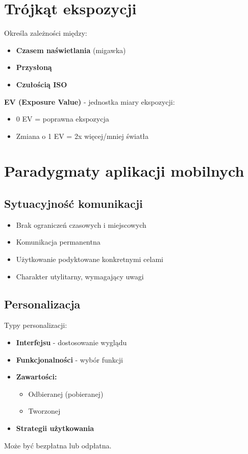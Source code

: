 \section{Trójkąt ekspozycji}
Określa zależności między:
\begin{itemize}[noitemsep]
    \item \textbf{Czasem naświetlania} (migawka)
    \item \textbf{Przysłoną}
    \item \textbf{Czułością ISO}
\end{itemize}

\textbf{EV (Exposure Value)} - jednostka miary ekspozycji:
\begin{itemize}[noitemsep]
    \item 0 EV = poprawna ekspozycja
    \item Zmiana o 1 EV = 2x więcej/mniej światła
\end{itemize}

\section{Paradygmaty aplikacji mobilnych}

\subsection{Sytuacyjność komunikacji}
\begin{itemize}[noitemsep]
    \item Brak ograniczeń czasowych i miejscowych
    \item Komunikacja permanentna
    \item Użytkowanie podyktowane konkretnymi celami
    \item Charakter utylitarny, wymagający uwagi
\end{itemize}

\subsection{Personalizacja}
Typy personalizacji:
\begin{itemize}[noitemsep]
    \item \textbf{Interfejsu} - dostosowanie wyglądu
    \item \textbf{Funkcjonalności} - wybór funkcji
    \item \textbf{Zawartości:}
    \begin{itemize}[noitemsep]
        \item Odbieranej (pobieranej)
        \item Tworzonej
    \end{itemize}
    \item \textbf{Strategii użytkowania}
\end{itemize}
Może być bezpłatna lub odpłatna.


